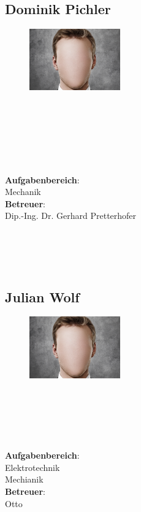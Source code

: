 \subsection*{Dominik Pichler}
\begin{figure}
\begin{center}
  \includegraphics[width=0.35\textwidth]{Bilder/face.jpg}
\end{center}
\end{figure}
\mbox{}\\
\mbox{}\\
\mbox{}\\
\mbox{}\\
\mbox{}\\
\mbox{}\\
\textbf{Aufgabenbereich}:\\
Mechanik\\
\textbf{Betreuer}:\\
Dip.-Ing. Dr. Gerhard Pretterhofer
\mbox{}\\
\mbox{}\\
\mbox{}\\
\mbox{}\\
\mbox{}\\

\subsection*{Julian Wolf}
\begin{figure}
\begin{center}
  \includegraphics[width=0.35\textwidth]{Bilder/face.jpg}
\end{center}
\end{figure}
\mbox{}\\
\mbox{}\\
\mbox{}\\
\mbox{}\\
\mbox{}\\
\textbf{Aufgabenbereich}:\\
Elektrotechnik\\
Mechianik\\
\textbf{Betreuer}:\\
Otto